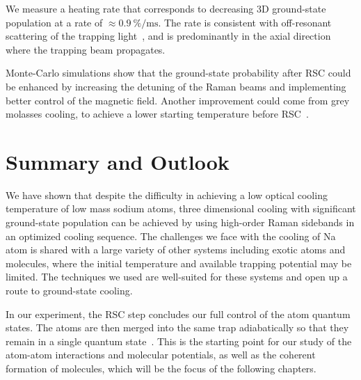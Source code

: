 We measure a heating rate that corresponds to decreasing 3D ground-state population
at a rate of $\approx\!0.9~\mathrm{\%/ms}$.
The rate is consistent with off-resonant scattering of
the trapping light~\cite{grimm_optical_2000},
and is predominantly in the axial direction where the trapping beam propagates.

Monte-Carlo simulations show that the ground-state probability after RSC
could be enhanced by increasing the detuning of the Raman beams and implementing
better control of the magnetic field. Another improvement could come from
grey molasses cooling,
to achieve a lower starting temperature before RSC~\cite{colzi_sub-doppler_2016}.

\section{Summary and Outlook}
\label{ch:rsc:summary}

We have shown that despite the difficulty in achieving a low optical cooling temperature
of low mass sodium atoms, three dimensional cooling
with significant ground-state population can be achieved
by using high-order Raman sidebands in an optimized cooling sequence.
The challenges we face with the cooling of Na atom is shared with
a large variety of other systems including exotic atoms and molecules,
where the initial temperature and available trapping potential may be limited.
The techniques we used are well-suited for these systems
and open up a route to ground-state cooling.

In our experiment, the RSC step concludes our full control of the atom quantum states.
The atoms are then merged into the same trap adiabatically
so that they remain in a single quantum state~\cite{liu_molecular_2019}.
This is the starting point for our study of
the atom-atom interactions and molecular potentials,
as well as the coherent formation of molecules,
which will be the focus of the following chapters.
